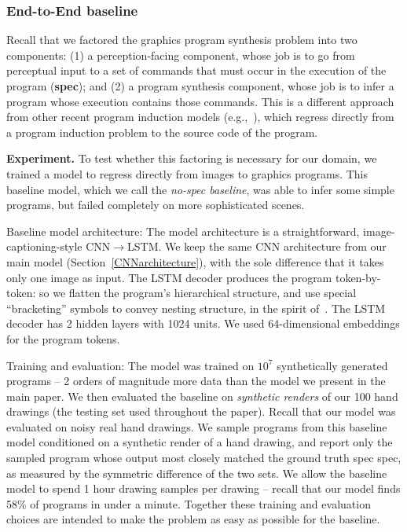 \documentclass{article}
\begin{document}
\subsubsection{End-to-End baseline}

Recall that we factored the graphics program synthesis problem into two components: (1) a perception-facing component, whose job is to go from perceptual input to a set of commands that must occur in the execution of the program (\textbf{spec}); and (2) a program synthesis component, whose job is to infer a program whose execution contains those commands. This is a different approach from other recent program induction models (e.g.,~\cite{devlin2017robustfill,nps}), which regress directly from a program induction problem to the source code of the program.

\textbf{Experiment.} To test whether this factoring is necessary for our domain, we trained a model to regress directly from images to graphics programs. This baseline model, which we call the \emph{no-spec baseline}, was able to infer some simple programs, but failed completely on more sophisticated scenes.

Baseline model architecture: The model architecture is a straightforward, image-captioning-style CNN$\to$LSTM. We keep the same CNN architecture from our main model (Section~\ref{CNNarchitecture}), with the sole difference that it takes only one image as input. The LSTM decoder produces the program token-by-token: so we flatten the program's hierarchical structure, and use special ``bracketing'' symbols to convey nesting structure, in the spirit of~\citep{vinyals2015grammar}. The LSTM decoder has 2 hidden layers with 1024 units. We used 64-dimensional embeddings for the program tokens.

Training and evaluation: The model was trained on $10^7$ synthetically generated programs -- 2 orders of magnitude more data than the model we present in the main paper. We then evaluated the baseline on \emph{synthetic renders} of our 100 hand drawings (the testing set used throughout the paper). Recall that our model was evaluated on noisy real hand drawings. We sample programs from this baseline model conditioned on a synthetic render of a hand drawing, and report only the sampled program whose output most closely matched the ground truth spec spec, as measured by the symmetric difference of the two sets. We allow the baseline model to spend 1 hour drawing samples per drawing -- recall that our model finds 58\% of programs in under a minute. Together these training and evaluation choices are intended to make the problem as easy as possible for the baseline.
\end{document}
